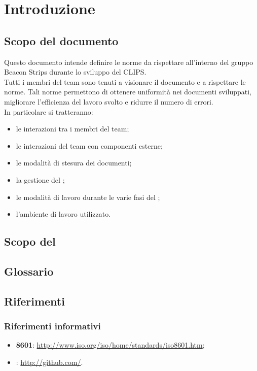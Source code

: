 \section{Introduzione}
	\subsection{Scopo del documento}
	Questo documento intende definire le norme da rispettare all'interno del gruppo Beacon Strips durante lo sviluppo del  CLIPS. \\
	Tutti i membri del team sono tenuti a visionare il documento e a rispettare le norme. Tali norme permettono di ottenere uniformità nei documenti sviluppati,
	migliorare l'efficienza del lavoro svolto e ridurre il numero di errori. \\
	In particolare si tratteranno:
	\begin{itemize}
		\item le interazioni tra i membri del team;
		\item le interazioni del team con componenti esterne;
		\item le modalità di stesura dei documenti;
		\item la gestione del ;
		\item le modalità di lavoro durante le varie fasi del ;
		\item l'ambiente di lavoro utilizzato.
	\end{itemize}
	
	\subsection{Scopo del }
		\SCOPO
	\subsection{Glossario}
		\GLOSSARIO
	\subsection{Riferimenti}
		\subsubsection{Riferimenti informativi}
		\begin{itemize}
			\item \textbf{ 8601}: \url{http://www.iso.org/iso/home/standards/iso8601.htm};
			\item \textbf{}: \url{http://github.com/}.
		\end{itemize}
	
